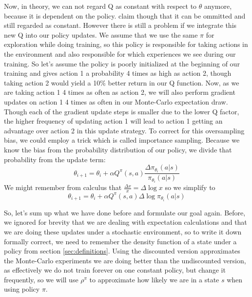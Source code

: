 \documentclass[hyperref,german,beleg]{cgvpub}
\begin{document}
Now, in theory, we can not regard Q as constant with respect to $\theta$ anymore, because it is dependent on the policy. \cite{suttonPolicyGradientMethods} claim though that it can be ommitted and still regarded as constant. However there is still a problem if we integrate this new Q into our policy updates. We assume that we use the same $\pi$ for exploration while doing training, so this policy is responsible for taking actions in the environment and also responsible for which experiences we see during our training. So let's assume the policy is poorly initialized at the beginning of our training and gives action 1 a probability 4 times as high as action 2, though taking action 2 would yield a 10\% better return in our Q function. Now, as we are taking action 1 4 times as often as action 2, we will also perform gradient updates on action 1 4 times as often in our Monte-Carlo expectation draw. Though each of the gradient update steps is smaller due to the lower Q factor, the higher frequency of updating action 1 will lead to action 1 getting an advantage over action 2 in this update strategy. To correct for this oversampling bias, we could employ a trick which is called importance sampling. Because we know the bias from the probability distribution of our policy, we divide that probability from the update term:
\begin{equation}
\theta_{i+1} = \theta_i + \alpha Q^{\pi}(s, a) \frac{ \Delta \pi_{\theta_i}(a|s)}{\pi_{\theta_i}(a|s)}
\end{equation}
We might remember from calculus that $\frac{\Delta x}{x} = \Delta \log x$ so we simplify to
\begin{equation}
\theta_{i+1} = \theta_i + \alpha Q^{\pi}(s, a) \Delta \log \pi_{\theta_i}(a|s)
\label{equ:pg_update}
\end{equation}

So, let's sum up what we have done before and formulate our goal again. Before, we ignored for brevity that we are dealing with expectation calculations and that we are doing these updates under a stochastic environment, so to write it down formally correct, we need to remember the density function of a state under a policy from section \ref{sec:definitions}. Using the discounted version approximates the Monte-Carlo experiments we are doing better than the undiscounted version, as effectively we do not train forever on one constant policy, but change it frequently, so we will use $\rho^{\pi}$ to approximate how likely we are in a state $s$ when using policy $\pi$.
\end{document}
